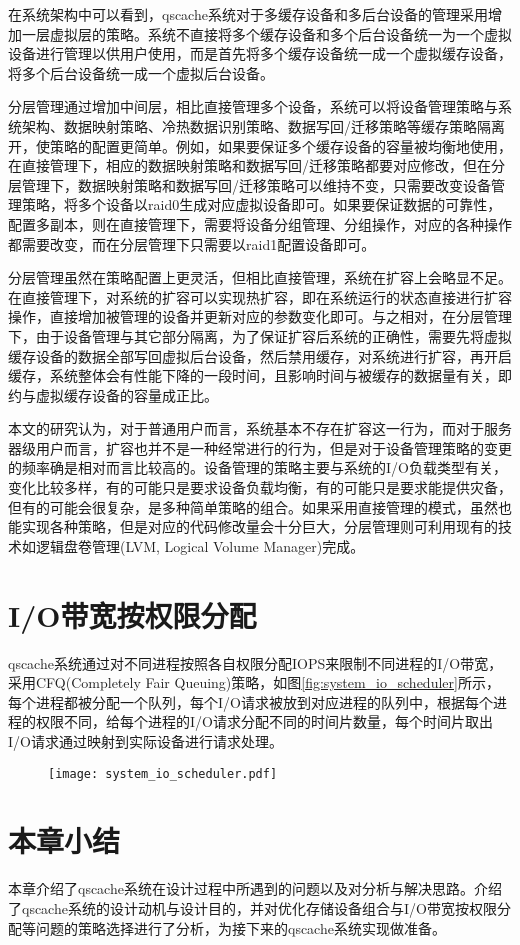 \label{sec:multi-cache_to_multi-backend}

在系统架构中可以看到，qscache系统对于多缓存设备和多后台设备的管理采用增加一层虚拟层的策略。系统不直接将多个缓存设备和多个后台设备统一为一个虚拟设备进行管理以供用户使用，而是首先将多个缓存设备统一成一个虚拟缓存设备，将多个后台设备统一成一个虚拟后台设备。

分层管理通过增加中间层，相比直接管理多个设备，系统可以将设备管理策略与系统架构、数据映射策略、冷热数据识别策略、数据写回/迁移策略等缓存策略隔离开，使策略的配置更简单。例如，如果要保证多个缓存设备的容量被均衡地使用，在直接管理下，相应的数据映射策略和数据写回/迁移策略都要对应修改，但在分层管理下，数据映射策略和数据写回/迁移策略可以维持不变，只需要改变设备管理策略，将多个设备以raid0生成对应虚拟设备即可。如果要保证数据的可靠性，配置多副本，则在直接管理下，需要将设备分组管理、分组操作，对应的各种操作都需要改变，而在分层管理下只需要以raid1配置设备即可。

分层管理虽然在策略配置上更灵活，但相比直接管理，系统在扩容上会略显不足。在直接管理下，对系统的扩容可以实现热扩容，即在系统运行的状态直接进行扩容操作，直接增加被管理的设备并更新对应的参数变化即可。与之相对，在分层管理下，由于设备管理与其它部分隔离，为了保证扩容后系统的正确性，需要先将虚拟缓存设备的数据全部写回虚拟后台设备，然后禁用缓存，对系统进行扩容，再开启缓存，系统整体会有性能下降的一段时间，且影响时间与被缓存的数据量有关，即约与虚拟缓存设备的容量成正比。

本文的研究认为，对于普通用户而言，系统基本不存在扩容这一行为，而对于服务器级用户而言，扩容也并不是一种经常进行的行为，但是对于设备管理策略的变更的频率确是相对而言比较高的。设备管理的策略主要与系统的I/O负载类型有关，变化比较多样，有的可能只是要求设备负载均衡，有的可能只是要求能提供灾备，但有的可能会很复杂，是多种简单策略的组合。如果采用直接管理的模式，虽然也能实现各种策略，但是对应的代码修改量会十分巨大，分层管理则可利用现有的技术如逻辑盘卷管理(LVM, Logical Volume Manager)\cite{wada2009logical}完成。

\section{I/O带宽按权限分配}

qscache系统通过对不同进程按照各自权限分配IOPS来限制不同进程的I/O带宽，采用CFQ(Completely Fair Queuing)策略，如图\ref{fig:system_io_scheduler}所示，每个进程都被分配一个队列，每个I/O请求被放到对应进程的队列中，根据每个进程的权限不同，给每个进程的I/O请求分配不同的时间片数量，每个时间片取出I/O请求通过映射到实际设备进行请求处理。

\begin{figure}[!htbp]
    \centering
    \texttt{[image: system\_io\_scheduler.pdf]}
\end{figure}

\section{本章小结}

本章介绍了qscache系统在设计过程中所遇到的问题以及对分析与解决思路。介绍了qscache系统的设计动机与设计目的，并对优化存储设备组合与I/O带宽按权限分配等问题的策略选择进行了分析，为接下来的qscache系统实现做准备。